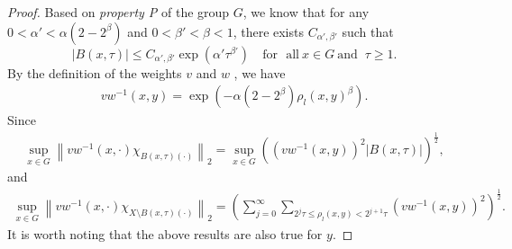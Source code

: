 \documentclass[10pt,a4paper]{amsart}
\begin{document}
\begin{proof}
		Based on {\it property P} of the group $G$, we know that for any $0<\alpha'<\alpha(2-2^{\beta})$ and $0<\beta'<\beta<1$, there exists $C_{\alpha' ,\beta' }$ such that
		\[ \left | B(x,\tau) \right | \le C_{\alpha' ,\beta' }\exp(\alpha' \tau^{\beta' })%
		\quad\text{for~ all}~  x\in G~\text{and
		}~\tau\ge1.\]
		By the definition of the weights $v$ and $w$ , we have
		\begin{align}\label{vw}
			vw^{-1}(x,y)=\exp(-\alpha (2-2^{\beta }) \rho_{l}(x,y)^{\beta}).
		\end{align}
		Since 
		\begin{gather}\label{2.7'}
			\sup_{x\in G}\left \| vw^{-1}\left ( x,\cdot \right )\chi _{B\left ( x,\tau  \right )\left ( \cdot  \right )  }  \right \|_{2}=\sup_{x\in G}(  (	vw^{-1}(x,y)    )^{2} \left | B(x,\tau ) \right |)^\frac{1}{2},
		\end{gather}
		and
		\begin{gather}\label{2.7}
			\sup_{x\in G}\left \| vw^{-1}\left ( x,\cdot \right )\chi _{X\setminus B\left ( x,\tau  \right )\left ( \cdot  \right )  }  \right \|_{2}=(\sum_{j=0}^{\infty } \sum _{2^{j}\tau \le\rho_l (x,y)< 2^{j+1}\tau} ( vw^{-1}(x,y)  )^{2})^\frac{1}{2}.
		\end{gather}
		It is worth noting that the above results are also true for $y$.
		

\end{proof}
\end{document}
